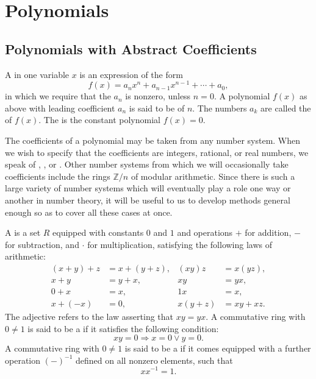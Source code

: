 \chapter{Polynomials}\label{chapter:polynomials}

\section{Polynomials with Abstract Coefficients}

\begin{definition}
  A  in one variable $x$ is an expression of the form
  \begin{equation*}
    f(x) = a_nx^n+ a_{n-1}x^{n-1} +\cdots + a_0,
  \end{equation*}
  in which we require that the  $a_n$ is nonzero, unless $n=0$. A polynomial $f(x)$ as above with leading coefficient $a_n$ is said to be of  $n$. The numbers $a_k$ are called the  of $f(x)$. The  is the constant polynomial $f(x)=0$.
\end{definition}

The coefficients of a polynomial may be taken from any number system. When we wish to specify that the coefficients are integers, rational, or real numbers, we speak of , , or . Other number systems from which we will occasionally take coefficients include the rings $\mathbb{Z}/n$ of modular arithmetic. Since there is such a large variety of number systems which will eventually play a role one way or another in number theory, it will be useful to us to develop methods general enough so as to cover all these cases at once.

\begin{definition}
  A  is a set $R$ equipped with constants $0$ and $1$ and operations $+$ for addition, $-$ for subtraction, and $\cdot$ for multiplication, satisfying the following laws of arithmetic:
  \begin{align*}
    (x+y)+z & = x + (y+ z), & (xy)z & = x(yz), \\
    x + y & = y + x, & xy & = yx, \\
    0+x & = x, & 1x & = x, \\
    x+(-x) & = 0, & x(y+z) & = xy+xz.
  \end{align*}
  The adjective  refers to the law asserting that $xy=yx$. A commutative ring with $0\neq 1$ is said to be a  if it satisfies the following condition:
  \begin{equation*}
    xy=0 \Rightarrow x=0\lor y=0.
  \end{equation*}
  A commutative ring with $0\neq 1$ is said to be a  if it comes equipped with a further operation $({-})^{-1}$ defined on all nonzero elements, such that
  \begin{equation*}
    xx^{-1}=1.
  \end{equation*}
\end{definition}

